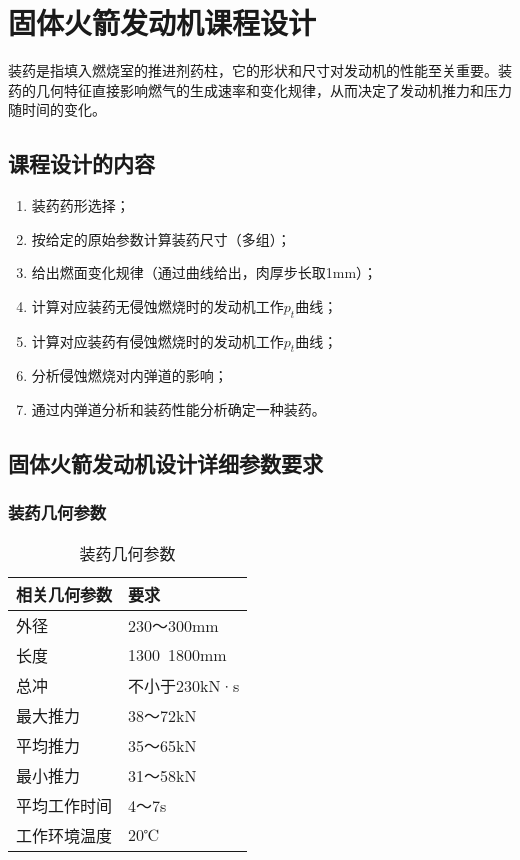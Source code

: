 
\chapter{固体火箭发动机课程设计}

装药是指填入燃烧室的推进剂药柱，它的形状和尺寸对发动机的性能至关重要。装药的几何特征直接影响燃气的生成速率和变化规律，从而决定了发动机推力和压力随时间的变化。

\section{课程设计的内容}

\begin{enumerate}[leftmargin=2em]
    \item 装药药形选择；
    \item 按给定的原始参数计算装药尺寸（多组）；
    \item 给出燃面变化规律（通过曲线给出，肉厚步长取1mm）；
    \item 计算对应装药无侵蚀燃烧时的发动机工作$p_{t}$曲线；
    \item 计算对应装药有侵蚀燃烧时的发动机工作$p_{t}$曲线；
    \item 分析侵蚀燃烧对内弹道的影响；
    \item 通过内弹道分析和装药性能分析确定一种装药。
\end{enumerate}
\section{固体火箭发动机设计详细参数要求}

\subsection{装药几何参数}

\begin{table}
  \centering
  \caption{装药几何参数}
  \begin{tabular}{ll}
    \toprule
    相关几何参数          & 要求                         \\
    \midrule
    外径   & 230～300mm \\
    长度   & 1300~1800mm                     \\
    总冲   & 不小于230kN·s    \\
    最大推力   & 38～72kN    \\
    平均推力   & 35～65kN    \\
    最小推力   & 31～58kN    \\
    平均工作时间   & 4～7s    \\
    工作环境温度   & 20℃    \\

    \bottomrule
  \end{tabular}
  \label{tab:three-line}
\end{table}

